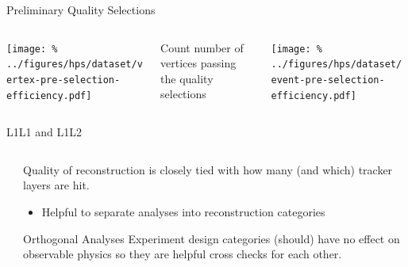 \documentclass[aspectratio=169]{beamer}
\begin{document}
\begin{frame}{Preliminary Quality Selections}
  \begin{columns}
    \begin{column}{0.35\textwidth}
      \centering
      \texttt{[image: \%
        ../figures/hps/dataset/vertex-pre-selection-efficiency.pdf]}
    \end{column}
    \begin{column}{0.3\textwidth}
      Count number of vertices passing the
      quality selections
    \end{column}
    \begin{column}{0.35\textwidth}
      \centering
      \texttt{[image: \%
        ../figures/hps/dataset/event-pre-selection-efficiency.pdf]}
    \end{column}
  \end{columns}
\end{frame}


\begin{frame}{L1L1 and L1L2}
  \begin{columns}
    \begin{column}{0.3\textwidth}
      \resizebox{\textwidth}{!}{}
      \resizebox{\textwidth}{!}{}
    \end{column}
    \begin{column}{0.6\textwidth}
      Quality of reconstruction is closely tied with how many (and which)
      tracker layers are hit.
      \begin{itemize}
        \item Helpful to separate analyses into reconstruction categories
      \end{itemize}
      \vfill
      \begin{block}{Orthogonal Analyses}
        Experiment design categories (should) have no effect on observable
        physics so they are helpful cross checks for each other.
      \end{block}
    \end{column}
  \end{columns}
\end{frame}
\end{document}
